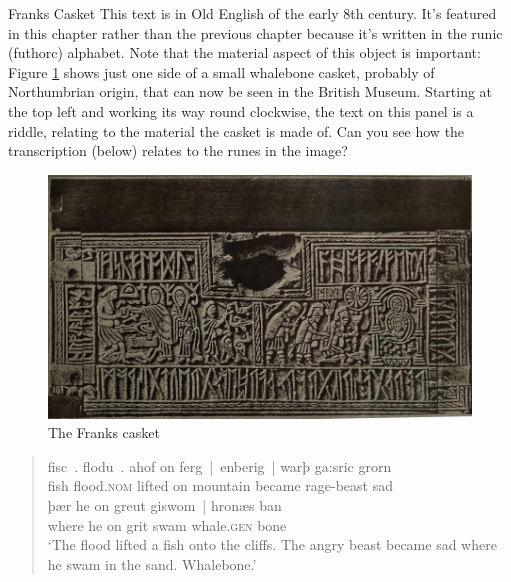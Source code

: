 \begin{texts}{Franks Casket}
This text is in Old English of the early 8th century. It's featured in this chapter rather than the previous chapter because it's written in the runic (futhorc) alphabet. Note that the material aspect of this object is important: Figure \ref{fig:franks-casket} shows just one side of a small whalebone casket, probably of Northumbrian origin, that can now be seen in the British Museum. Starting at the top left and working its way round clockwise, the text on this panel is a riddle, relating to the material the casket is made of. Can you see how the transcription (below) relates to the runes in the image?

\begin{figure}[H]
        \includegraphics[width=\textwidth]{chapters/img/franks-casket.png}
    \caption{The Franks casket}
    \label{fig:franks-casket}
\end{figure}

\begin{quote}
    \gll fisc~. flodu~. ahof on ferg~|~enberig~| warþ ga:sric grorn\\
    fish flood.\textsc{nom} lifted on mountain  became  rage-beast sad\\\newline
    \gll þær he on greut giswom~| hronæs ban\\
    where he on grit swam whale.\textsc{gen} bone\\\newline
    \trans `The flood lifted a fish onto the cliffs. The angry beast became sad where he swam in the sand. Whalebone.'
\end{quote}



\end{texts}

